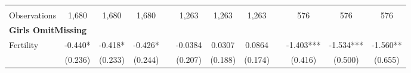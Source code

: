 \begin{landscape}
\begin{table}[htpb!]
\begin{center}
\begin{tabular}{lcccp{2mm}cccp{2mm}ccc}
\begin{footnotesize}\end{footnotesize}&\begin{footnotesize}\end{footnotesize}&\begin{footnotesize}\end{footnotesize}&\begin{footnotesize}\end{footnotesize}&\begin{footnotesize}\end{footnotesize}&\begin{footnotesize}\end{footnotesize}&\begin{footnotesize}\end{footnotesize}&\begin{footnotesize}\end{footnotesize}&\begin{footnotesize}\end{footnotesize}&\begin{footnotesize}\end{footnotesize}&\begin{footnotesize}\end{footnotesize}&\begin{footnotesize}\end{footnotesize}\\Observations&1,680&1,680&1,680&&1,263&1,263&1,263&&576&576&576\\
\multicolumn{12}{l}{\textbf{Girls OmitMissing}}\\ 
Fertility&-0.440*&-0.418*&-0.426*&&-0.0384&0.0307&0.0864&&-1.403***&-1.534***&-1.560**\\
&(0.236)&(0.233)&(0.244)&&(0.207)&(0.188)&(0.174)&&(0.416)&(0.500)&(0.655)\\

\end{tabular}
\end{center}
\end{table}
\end{landscape}
